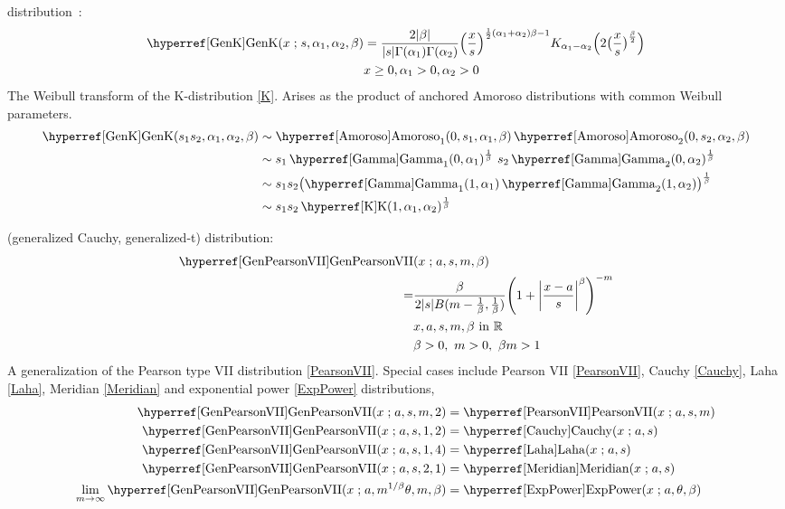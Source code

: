 \secbreak
{} distribution~\cite{Malik1968}:
\begin{align}
\label{GenK}
\opr{GenK}(x\given s, \alpha_1, \alpha_2,\beta) &= 
\frac{2 |\beta| }{|s| \Gamma(\alpha_1)\Gamma(\alpha_2)}
 \Bigl( \frac{x}{s} \Bigr)^{\half(\alpha_1+\alpha_2 )\beta -1} K_{\alpha_1-\alpha_2} \Bigl(2 \bigl(\frac{x}{s}\bigr)^{\sfrac{\beta}{2} } \Bigr)
\checked
\\
& x\geq 0, \alpha_1>0, \alpha_2>0 \notag
\end{align}
The Weibull transform of the K-distribution \eqref{K}. Arises as the product of anchored Amoroso distributions  with common Weibull parameters.
\begin{align*}
\opr{GenK}(s_1 s_2, \alpha_1, \alpha_2,\beta) &  \sim \opr{Amoroso}_1(0, s_1,\alpha_1, \beta) 
 \opr{Amoroso}_2 (0,s_2,\alpha_2, \beta)  \checked
 \\
& \sim s_1 \opr{Gamma}_1(0,\alpha_1)^{\sfrac{1}{\beta}} \  s_2 \opr{Gamma}_2(0,\alpha_2)^{\sfrac{1}{\beta}} \checked
\\ & \sim s_1 s_2 \bigl( \opr{Gamma}_1(1,\alpha_1) \opr{Gamma}_2(1,\alpha_2) \bigr)^{\sfrac{1}{\beta}} \checked
\\ & \sim s_1 s_2 \opr{K}(1,\alpha_1,\alpha_2)^{\sfrac{1}{\beta}} \checked
\end{align*}



\secbreak
 (generalized Cauchy, generalized-t) distribution\linebreak\cite{Rider1957,Miller1972,McDonald1988,McDonald1991,Nadarajah2003,Aysal2007}:
\begin{align}
\label{GenPearsonVII}
\opr{GenPearsonVII}&(x\given a,s, m,\beta)  
\\= & \frac{\beta}{2 |s| B(m-\frac{1}{\beta}, \frac{1}{\beta} )} \Left( 1 +\Left| \frac{x-a}{s}\Right|^{\beta} \Right)^{-m} \checked
\notag \\
\notag & x, a,s, m,\beta \text{ in } {\mathbb R} \\
&  \beta>0,\ m>0,\ \beta m >1
\notag
\end{align}
A  generalization of the Pearson type VII distribution \eqref{PearsonVII}. Special cases include Pearson VII \eqref{PearsonVII}, Cauchy \eqref{Cauchy},   Laha \eqref{Laha},   Meridian \eqref{Meridian} and exponential power \eqref{ExpPower} distributions,
\begin{align*}
\opr{GenPearsonVII}(x\given a,s, m,2) &= \opr{PearsonVII}(x\given a,s,m) \checked \\
\opr{GenPearsonVII}(x\given a,s, 1,2) &= \opr{Cauchy}(x\given a,s) \checked \\
\opr{GenPearsonVII}(x\given a,s, 1,4) &= \opr{Laha}(x\given a,s) \checked \\
\opr{GenPearsonVII}(x\given a,s, 2,1) &= \opr{Meridian}(x\given a,s)  \checked \\
\lim_{m\rightarrow\infty} \opr{GenPearsonVII}(x\given a,m^{1/\beta}\theta, m,\beta) & = \opr{ExpPower}(x\given a,\theta,\beta)
\checked
\end{align*}

